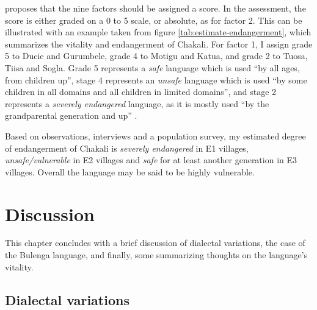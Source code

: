  \cite{Reco03} proposes that  
the nine factors  should be assigned a score. In the assessment, the score is
either graded on a  0 to 5 scale, or absolute, as for factor 2.   This can be
illustrated  with an example taken from figure
\ref{tab:estimate-endangerment}, which summarizes the vitality and endangerment
of Chakali. For
factor 1, I assign grade 5 to Ducie and
Gurumbele, grade 4 to Motigu and Katua, and grade 2 to Tuosa, Tiisa and Sogla.
 Grade 5 represents a {\it safe} language which is used ``by all ages, from
children up'',  stage 4 represents an {\it unsafe} language which is used ``by
some
children in all domains and all children in limited domains'', and  stage 2
represents a {\it severely endangered} language,  as it is mostly used ``by the
grandparental generation and up'' \cite[8]{Reco03}. 


 Based on  observations,
interviews and a population survey, my estimated degree of
endangerment of Chakali is {\it severely endangered} in  E1 villages, {\it
unsafe/vulnerable} in E2 villages and {\it safe} for at least another generation
in E3 villages. Overall the language may be said to be highly vulnerable.  





\section{Discussion}
\label{sec:SOC-discussion}

This chapter concludes with a  brief discussion of  dialectal variations, 
the case of the Bulenga language,  and finally,  some
summarizing thoughts on the language's vitality.





\subsection{Dialectal variations}
\label{sec:dialect}

